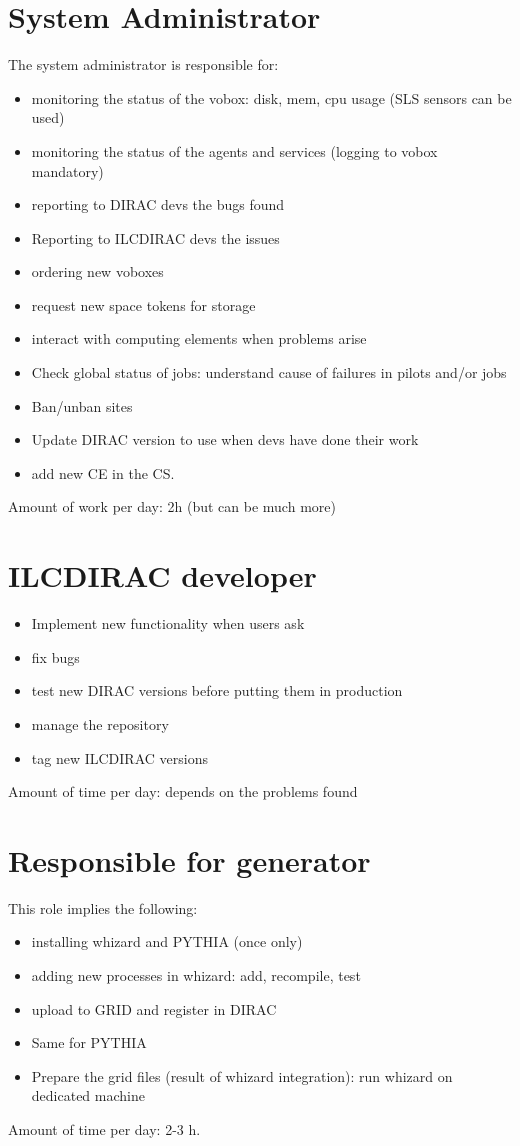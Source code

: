 \documentclass[12pt]{article}
\begin{document}
 \section{System Administrator}
 The system administrator is responsible for:
 \begin{itemize}
   \item monitoring the status of the vobox: disk, mem, cpu usage (SLS sensors
   can be used)
   \item monitoring the status of the agents and services (logging to vobox
   mandatory)
   \item reporting to DIRAC devs the bugs found
   \item Reporting to ILCDIRAC devs the issues
   \item ordering new voboxes
   \item request new space tokens for storage
   \item interact with computing elements when problems arise 
   \item Check global status of jobs: understand cause of failures in pilots
   and/or jobs
   \item Ban/unban sites
   \item Update DIRAC version to use when devs have done their work
   \item add new CE in the CS. 
 \end{itemize}
 Amount of work per day: 2h (but can be much more)
 
 \section{ILCDIRAC developer}
 \begin{itemize}
   \item Implement new functionality when users ask
   \item fix bugs
   \item test new DIRAC versions before putting them in production
   \item manage the repository
   \item tag new ILCDIRAC versions
 \end{itemize}
 Amount of time per day: depends on the problems found
 
 \section{Responsible for generator}
 This role implies the following:
 \begin{itemize}
   \item installing whizard and PYTHIA (once only)
   \item adding new processes in whizard: add, recompile, test
   \item upload to GRID and register in DIRAC 
   \item Same for PYTHIA
   \item Prepare the grid files (result of whizard integration): run whizard on
   dedicated machine
 \end{itemize}
 Amount of time per day: 2-3 h.
\end{document}
